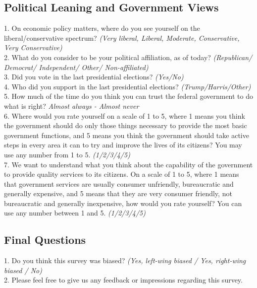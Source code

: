 \documentclass[11pt]{article}
\begin{document}
\subsection*{Political Leaning and Government Views}
1. On economic policy matters, where do you see yourself on the liberal/conservative spectrum? \textit{(Very liberal, Liberal, Moderate, Conservative, Very Conservative)} \\[0.5em]
2. What do you consider to be your political affiliation, as of today? \textit{(Republican/ Democrat/ Independent/ Other/ Non-affiliated)}\\[0.5em]
3. Did you vote in the last presidential elections? \textit{(Yes/No)}\\[0.5em]
4. Who did you support in the last presidential elections? \textit{(Trump/Harris/Other)}\\[0.5em]
5. How much of the time do you think you can trust the federal government to do what is right? \textit{Almost always - Almost never}\\[0.5em]
6. Where would you rate yourself on a scale of 1 to 5, where 1 means you think the government should do only those things necessary to provide the most basic government functions, and 5 means you think the government should take active steps in every area it can to try and improve the lives of its citizens? You may use any number from 1 to 5. \textit{(1/2/3/4/5)}\\[0.5em]
7. We want to understand what you think about the capability of the government to provide quality services to its citizens. On a scale of 1 to 5, where 1 means that government services are usually consumer unfriendly, bureaucratic and generally expensive, and 5 means that they are very consumer friendly, not bureaucratic and generally inexpensive, how would you rate yourself? You can use any number between 1 and 5. \textit{(1/2/3/4/5)}
\subsection*{Final Questions}
1. Do you think this survey was biased? \textit{(Yes, left-wing biased / Yes, right-wing biased / No)}\\[0.5em]
2. Please feel free to give us any feedback or impressions regarding this survey.  
\end{document}
